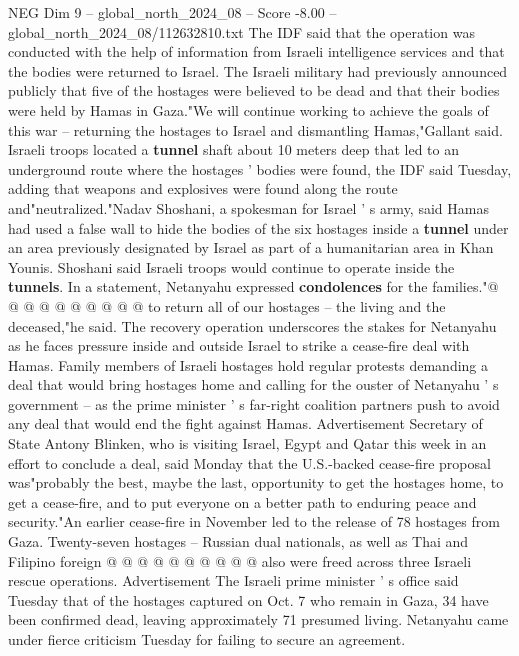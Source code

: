 \begin{textsample}{NEG Dim 9 – global\_north\_2024\_08 – Score -8.00 – global\_north\_2024\_08/112632810.txt}  \label{ex:f9_neg_085}
The IDF said that the operation was conducted with the help of information from Israeli intelligence services and that the bodies were returned to Israel.
The Israeli military had previously announced publicly that five of the hostages were believed to be dead and that their bodies were held by Hamas in Gaza."We will continue working to achieve the goals of this war -- returning the hostages to Israel and dismantling Hamas,"Gallant said.
Israeli troops located a \textbf{tunnel} shaft about 10 meters deep that led to an underground route where the hostages ' bodies were found, the IDF said Tuesday, adding that weapons and explosives were found along the route and"neutralized."Nadav Shoshani, a spokesman for Israel ' s army, said Hamas had used a false wall to hide the bodies of the six hostages inside a \textbf{tunnel} under an area previously designated by Israel as part of a humanitarian area in Khan Younis.
Shoshani said Israeli troops would continue to operate inside the \textbf{tunnels}.
In a statement, Netanyahu expressed \textbf{condolences} for the families."@ @ @ @ @ @ @ @ @ @ to return all of our hostages -- the living and the deceased,"he said.
The recovery operation underscores the stakes for Netanyahu as he faces pressure inside and outside Israel to strike a cease-fire deal with Hamas.
Family members of Israeli hostages hold regular protests demanding a deal that would bring hostages home and calling for the ouster of Netanyahu ' s government -- as the prime minister ' s far-right coalition partners push to avoid any deal that would end the fight against Hamas.
Advertisement Secretary of State Antony Blinken, who is visiting Israel, Egypt and Qatar this week in an effort to conclude a deal, said Monday that the U.S.-backed cease-fire proposal was"probably the best, maybe the last, opportunity to get the hostages home, to get a cease-fire, and to put everyone on a better path to enduring peace and security."An earlier cease-fire in November led to the release of 78 hostages from Gaza.
Twenty-seven hostages -- Russian dual nationals, as well as Thai and Filipino foreign @ @ @ @ @ @ @ @ @ @ also were freed across three Israeli rescue operations.
Advertisement The Israeli prime minister ' s office said Tuesday that of the hostages captured on Oct. 7 who remain in Gaza, 34 have been confirmed dead, leaving approximately 71 presumed living.
Netanyahu came under fierce criticism Tuesday for failing to secure an agreement.

\end{textsample}
